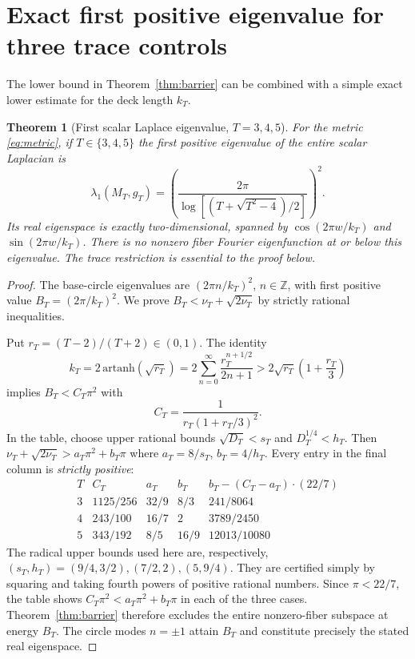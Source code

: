 \documentclass[11pt,a4paper]{article}
\newtheorem{theorem}{Theorem}
\newcommand{\Z}{\mathbb Z}
\begin{document}
\section{Exact first positive eigenvalue for three trace controls}
The lower bound in Theorem~\ref{thm:barrier} can be combined
with a simple exact lower estimate for the deck length $k_T$.

\begin{theorem}[First scalar Laplace eigenvalue, $T=3,4,5$]
\label{thm:first}
For the metric \eqref{eq:metric}, if $T\in\{3,4,5\}$
the first positive eigenvalue of the entire scalar Laplacian is
\begin{equation}\label{eq:first}
\boxed{\quad
\lambda_1(M_T,g_T)
=\left(\frac{2\pi}{\log[(T+\sqrt{T^2-4})/2]}\right)^2 .
\quad}
\end{equation}
Its real eigenspace is exactly two-dimensional, spanned by
$\cos(2\pi w/k_T)$ and $\sin(2\pi w/k_T)$.
There is no nonzero fiber Fourier eigenfunction at or below this
eigenvalue. The trace restriction is essential to the proof below.
\end{theorem}
\begin{proof}
The base-circle eigenvalues are $(2\pi n/k_T)^2$,
$n\in\Z$, with first positive value $B_T=(2\pi/k_T)^2$.
We prove $B_T<\nu_T+\sqrt{2\nu_T}$ by strictly rational
inequalities.

Put $r_T=(T-2)/(T+2)\in(0,1)$.
The identity
\[
k_T=2\,\mathrm{artanh}(\sqrt{r_T})
=2\sum_{n=0}^{\infty}\frac{r_T^{n+1/2}}{2n+1}
>2\sqrt{r_T}\left(1+\frac{r_T}{3}\right)
\]
implies $B_T<C_T\pi^2$ with
\[
C_T=\frac{1}{r_T(1+r_T/3)^2}.
\]
In the table, choose upper rational bounds
$\sqrt{D_T}<s_T$ and $D_T^{1/4}<h_T$.
Then
$\nu_T+\sqrt{2\nu_T}>a_T\pi^2+b_T\pi$
where $a_T=8/s_T$, $b_T=4/h_T$.
Every entry in the final column is \emph{strictly positive}:
\[
\begin{array}{c|c|c|c|c}
T&C_T&a_T&b_T&
b_T-(C_T-a_T)\cdot(22/7)\\ \hline
3&1125/256&32/9&8/3&241/8064\\
4&243/100&16/7&2&3789/2450\\
5&343/192&8/5&16/9&12013/10080
\end{array}
\]
The radical upper bounds used here are, respectively,
$(s_T,h_T)=(9/4,3/2),(7/2,2),(5,9/4)$.
They are certified simply by squaring and taking fourth powers
of positive rational numbers.
Since $\pi<22/7$, the table shows
$C_T\pi^2<a_T\pi^2+b_T\pi$ in each of
the three cases. Theorem~\ref{thm:barrier} therefore excludes
the entire nonzero-fiber subspace at energy $B_T$.
The circle modes $n=\pm1$ attain $B_T$ and constitute
precisely the stated real eigenspace.
\end{proof}
\end{document}
